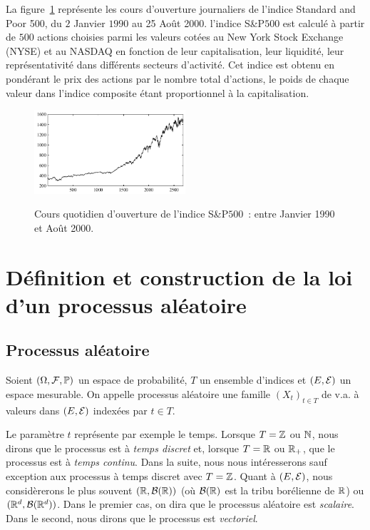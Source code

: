 \begin{example}
La figure~\ref{fig:SP} repr\'esente les cours d'ouverture
journaliers de l'indice Standard and Poor 500, du $2$ Janvier
$1990$ au 25 Ao\^ut 2000. l'indice S\&P$500$ est calcul\'e \`a
partir de $500$ actions choisies parmi les valeurs cot\'ees au New
York Stock Exchange (NYSE) et au NASDAQ en fonction de leur
capitalisation, leur liquidit\'e, leur repr\'esentativit\'e dans
diff\'erents secteurs d'activit\'e. Cet indice est obtenu en pond\'erant
le prix des actions par le nombre total d'actions, le poids de
chaque valeur dans l'indice composite \'etant proportionnel \`a la
capitalisation.
\begin{figure}
  \centering
  \includegraphics[width=0.5\textwidth]{Figures/SP}\\
  \caption{Cours quotidien d'ouverture de l'indice S\&P$500$~:
 entre Janvier 1990 et Ao\^ut 2000.}\label{fig:SP}
\end{figure}
\end{example}


\section{D\'efinition et construction de la loi d'un processus al\'eatoire}
\label{sec:gene}
\subsection{Processus al\'eatoire}

\begin{definition}
Soient $(\Omega,\mathcal{F},\mathbb{P})$ un espace de probabilit\'e, $T$ un
ensemble d'indices et $(E,\mathcal{E})$ un espace mesurable. On appelle
processus al\'eatoire une famille $(X_t)_{t \in T}$ de v.a. \`a
valeurs dans $(E,\mathcal{E})$ index\'ees par $t \in T$.
\end{definition}
Le param\`etre $t$ repr\'esente par exemple le temps. Lorsque $T=
\mathbb{Z}$ ou $\mathbb{N}$, nous dirons que le processus est \`a \emph{temps discret}
et, lorsque $T=\mathbb{R}$ ou $\mathbb{R}_+$, que le processus est \`a
\emph{temps continu}. Dans la suite, nous nous
int\'eresserons sauf exception aux processus \`a temps
discret avec $T= \mathbb{Z}$. Quant \`a $(E,\mathcal{E})$, nous consid\`ererons
le plus souvent $(\mathbb{R}, \mathcal{B}(\mathbb{R}))$ (o\`u $\mathcal{B}(\mathbb{R})$ est la
tribu bor\'elienne de $\mathbb{R}$) ou $(\mathbb{R}^d, \mathcal{B}(\mathbb{R}^d))$.
Dans le premier cas, on dira que le processus al\'eatoire est
\emph{scalaire}. Dans le second, nous dirons que le processus est
\emph{vectoriel}.

